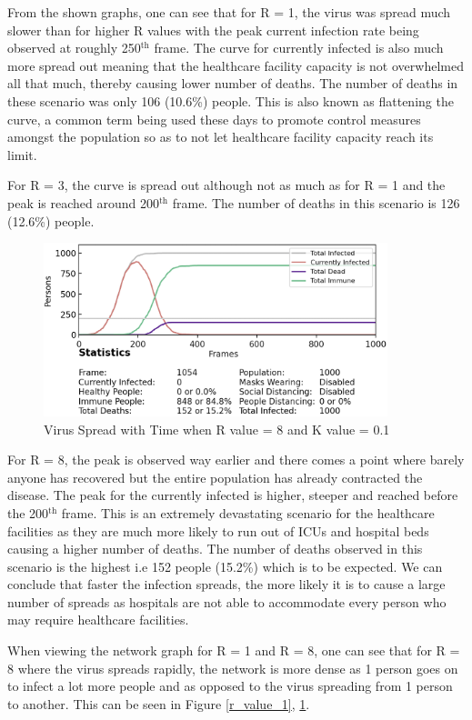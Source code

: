 \documentclass[11pt]{article}
\begin{document}
From the shown graphs, one can see that for R = 1, the virus was spread much slower than for higher R values with the peak current infection rate being observed at roughly 250$^\text{th}$ frame. The curve for currently infected is also much more spread out meaning that the healthcare facility capacity is not overwhelmed all that much, thereby causing lower number of deaths. The number of deaths in these scenario was only 106 (10.6\%) people. This is also known as flattening the curve, a common term being used these days to promote control measures amongst the population so as to not let healthcare facility capacity reach its limit. 

For R = 3, the curve is spread out although not as much as for R = 1 and the peak is reached around 200$^\text{th}$ frame. The number of deaths in this scenario is 126 (12.6\%) people.

\begin{figure}[H]
    \centering
    \includegraphics[width=10cm]{figures/r_value_comparison8.png}
    \caption{Virus Spread with Time when R value = 8 and K value = 0.1}
    \label{r_value_8}
\end{figure}

For R = 8, the peak is observed way earlier and there comes a point where barely anyone has recovered but the entire population has already contracted the disease. The peak for the currently infected is higher, steeper and reached before the 200$^\text{th}$ frame. This is an extremely devastating scenario for the healthcare facilities as they are much more likely to run out of ICUs and hospital beds causing a higher number of deaths. The number of deaths observed in this scenario is the highest i.e 152 people (15.2\%) which is to be expected. We can conclude that faster the infection spreads, the more likely it is to cause a large number of spreads as hospitals are not able to accommodate every person who may require healthcare facilities. 

When viewing the network graph for R = 1 and R = 8, one can see that for R = 8 where the virus spreads rapidly, the network is more dense as 1 person goes on to infect a lot more people and as opposed to the virus spreading from 1 person to another. This can be seen in Figure \ref{r_value_1}, \ref{r_value_8}.
\end{document}
